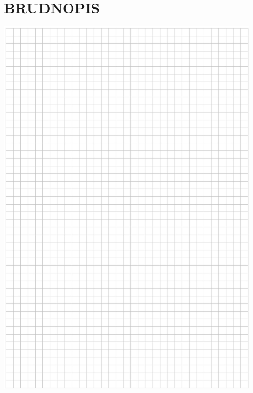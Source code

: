 \documentclass[10pt]{article}
\begin{document}
\section*{BRUDNOPIS}
\begin{center}
\includegraphics[max width=\textwidth]{2024_11_21_caf6b2e64dd65c9b24eeg-07}
\end{center}
\end{document}
